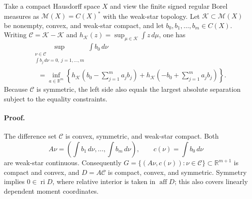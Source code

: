 \begin{lemma}
\label{si:lem:measure-duality}
Take a compact Hausdorff space $X$ and view the finite signed regular Borel
measures as $\mathcal M(X)=C(X)^*$ with the weak-star topology. Let
$\mathcal K\subset\mathcal M(X)$ be nonempty, convex, and weak-star compact,
and let $b_0,b_1,\ldots,b_m\in C(X)$.
Writing $\mathcal C=\mathcal K-\mathcal K$ and
$h_{\mathcal K}(z)=\sup_{\mu\in\mathcal K}\int z\,d\mu$, one has
\begin{align}
&\sup_{\substack{\nu\in\mathcal C\\
\int b_j\,d\nu=0,\ j=1,\ldots,m}}
\int b_0\,d\nu \nonumber\\
&\quad=\inf_{a\in\mathbb R^m}
\left\{h_{\mathcal K}\!\left(b_0-\sum_{j=1}^ma_jb_j\right)
+h_{\mathcal K}\!\left(-b_0+\sum_{j=1}^ma_jb_j\right)\right\}.
\label{si:eq:measure-duality-lemma}
\end{align}
Because $\mathcal C$ is symmetric, the left side also equals the largest
absolute separation subject to the equality constraints.
\end{lemma}

\paragraph{Proof.}
The difference set $\mathcal C$ is convex, symmetric, and weak-star compact.
Both
\begin{equation*}
A\nu=\left(\int b_1\,d\nu,\ldots,\int b_m\,d\nu\right),
\qquad c(\nu)=\int b_0\,d\nu
\end{equation*}
are weak-star continuous. Consequently
$G=\{(A\nu,c(\nu)):\nu\in\mathcal C\}\subset\mathbb R^{m+1}$ is compact and
convex, and $D=A\mathcal C$ is compact, convex, and symmetric. Symmetry implies
$0\in\operatorname{ri}D$, where relative interior is taken in
$\operatorname{aff}D$; this also covers linearly dependent moment coordinates.

